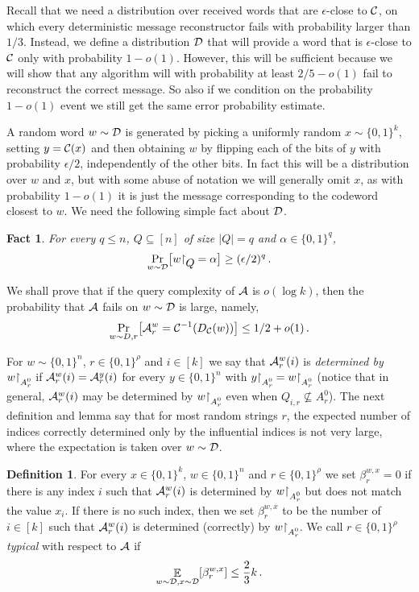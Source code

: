 \documentclass[10pt]{article}
\newtheorem{fact}[theorem]{Fact}
\theoremstyle{definition}
\newtheorem{definition}[theorem]{Definition}
\numberwithin{equation}{section}
\DeclareMathOperator*{\Exp}{{\mathbb{E}}}
\newcommand{\ALG}{{\cal A}}
\newcommand{\DD}{{\cal D}}
\newcommand{\CC}{{\cal C}}
\newcommand{\zo}{{\{0,1\}}}
\newcommand{\DEC}{{D_{\cal C}}}
\newcommand{\rst}[1]{\ensuremath{{\mathbin\upharpoonright}%
\raise-.9ex\hbox{$#1$}}}
\newcommand{\rstsmall}[1]{\ensuremath{{\mathbin\upharpoonright}%
\raise-.9ex\hbox{\scriptsize $#1$}}}
\begin{document}
%

%
Recall that we need a distribution over received words that are $\epsilon$-close to $\CC$, on which every deterministic message reconstructor fails with probability larger than $1/3$. Instead, we define a distribution $\DD$ that will provide a word that is $\epsilon$-close to $\CC$ only with probability $1-o(1)$. However, this will be sufficient because we will show that any algorithm will with probability at least $2/5-o(1)$ fail to reconstruct the correct message. So also if we condition on the probability $1-o(1)$ event we still get the same error probability estimate.

A random word $w\sim\DD$ is generated by picking a uniformly random $x\sim\zo^k$, setting $y=\CC(x)$ and then obtaining $w$ by flipping each of the bits of $y$ with probability $\epsilon/2$, independently of the other bits. In fact this will be a distribution over $w$ and $x$, but with some abuse of notation we will generally omit $x$, as with probability $1-o(1)$ it is just the message corresponding to the codeword closest to $w$.
We need the following simple fact about $\DD$.

%
%
%
%
%
%
%
%
\begin{fact}\label{lem:fact}
%
 For every $q \leq n$, 
$Q \subseteq [n]$ of size $|Q|=q$ and
 $\alpha \in \zo^q$,
\[
\Pr_{w \sim \DD}\bigl[w\rst{Q} = \alpha\bigr] \geq
 (\epsilon/2)^q\,.
\]
\end{fact}
%

We shall prove that if the query complexity of $\ALG$ is $o(\log k)$,
then the probability that $\ALG$ fails on $w \sim \DD$ is large,
namely,
\[
\Pr_{w \sim D, r}\bigl[\ALG^w_r = \CC^{-1}(\DEC(w))\bigr] \leq 1/2 + o(1)\,.
\]

For $w \sim \zo^n$, $r \in \zo^\rho$ and $i \in [k]$ we say that $\ALG^w_r(i)$ is \emph{determined by $w\rstsmall{A_r^0}$} if $\ALG^w_r(i) = \ALG^{y}_r(i)$ for every $y \in \zo^n$ with $y\rstsmall{A_r^0} = w\rstsmall{A_r^0}$ (notice that in general, $\ALG^w_r(i)$ may be determined by $w\rstsmall{A_r^0}$ even when $Q_{i,r} \nsubseteq A_r^0$). The next definition and lemma say that for most random strings $r$, the expected number of indices correctly determined only by the influential indices is not very large, where the expectation is taken over $w \sim \DD$.
\begin{definition}
For every $x\in\zo^k$, $w\in \zo^n$ and $r \in \zo^\rho$ we set
$\beta_r^{w,x}=0$ if there is any index $i$ such that $\ALG^w_r(i)$ is
determined by $w\rstsmall{A_r^0}$ but does not match the value $x_i$. If
there is no such index, then we set $\beta_r^{w,x}$ to be the number
of $i\in [k]$ such that  $\ALG^w_r(i)$ is determined (correctly) by
$w\rstsmall{A_r^0}$. We call $r\in\zo^\rho$ \emph{typical} with respect to
$\ALG$ if
\[
\Exp_{w\sim \DD,x\sim\DD}[\beta_r^{w,x}]\leq\frac23k\,.
\]
\end{definition}
\end{document}
